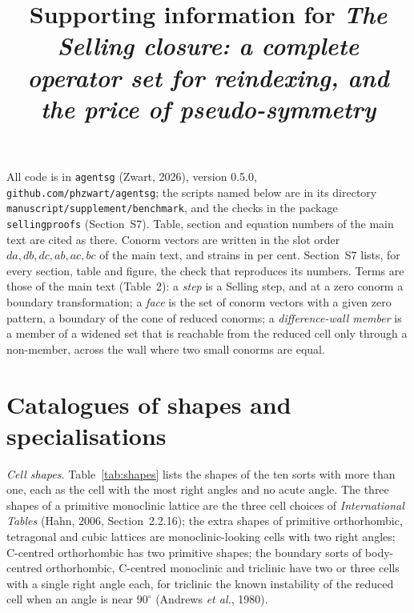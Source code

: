 \documentclass[preprint,pdf]{iucr}          %
\begin{document}
\title{Supporting information for \emph{The Selling closure: a complete operator set for reindexing, and the price of pseudo-symmetry}}
\maketitle

\renewcommand{\thesection}{S\arabic{section}}
\renewcommand{\thetable}{S\arabic{table}}
\renewcommand{\thefigure}{S\arabic{figure}}
\setcounter{table}{0}

All code is in \texttt{agentsg} (Zwart, 2026), version 0.5.0, \texttt{github.com/phzwart/agentsg}; the scripts named below are in its directory \texttt{manuscript/\allowbreak supplement/\allowbreak benchmark}, and the checks in the package \texttt{sellingproofs} (Section~S7). Table, section and equation numbers of the main text are cited as there. Conorm vectors are written in the slot order $da,db,dc,ab,ac,bc$ of the main text, and strains in per cent. Section~S7 lists, for every section, table and figure, the check that reproduces its numbers. Terms are those of the main text (Table~2): a \emph{step} is a Selling step, and at a zero conorm a boundary transformation; a \emph{face} is the set of conorm vectors with a given zero pattern, a boundary of the cone of reduced conorms; a \emph{difference-wall member} is a member of a widened set that is reachable from the reduced cell only through a non-member, across the wall where two small conorms are equal.

\section{Catalogues of shapes and specialisations}\label{app:catalogues}

\emph{Cell shapes.} Table~\ref{tab:shapes} lists the shapes of the ten sorts with more than one, each as the cell with the most right angles and no acute angle. The three shapes of a primitive monoclinic lattice are the three cell choices of \emph{International Tables} (Hahn, 2006, Section~2.2.16); the extra shapes of primitive orthorhombic, tetragonal and cubic lattices are monoclinic-looking cells with two right angles; C-centred orthorhombic has two primitive shapes; the boundary sorts of body-centred orthorhombic, C-centred monoclinic and triclinic have two or three cells with a single right angle each, for triclinic the known instability of the reduced cell when an angle is near $90^\circ$ (Andrews \emph{et al.}, 1980).
\end{document}
